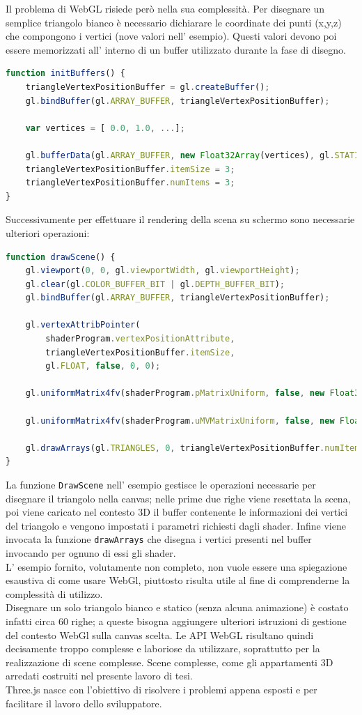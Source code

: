 Il problema di WebGL risiede però nella sua complessità.
Per disegnare un semplice triangolo bianco è necessario dichiarare le coordinate dei punti (x,y,z) che compongono i vertici (nove valori nell’ esempio).
Questi valori devono poi essere memorizzati all’ interno di un buffer utilizzato durante la fase di disegno.

\begin{lstlisting}[language=javascript]
function initBuffers() {
	triangleVertexPositionBuffer = gl.createBuffer();
	gl.bindBuffer(gl.ARRAY_BUFFER, triangleVertexPositionBuffer);

	var vertices = [ 0.0, 1.0, ...];

	gl.bufferData(gl.ARRAY_BUFFER, new Float32Array(vertices), gl.STATIC_DRAW);
	triangleVertexPositionBuffer.itemSize = 3;
	triangleVertexPositionBuffer.numItems = 3;
}
\end{lstlisting}
Successivamente per effettuare il rendering della scena su schermo sono necessarie ulteriori operazioni:

\begin{lstlisting}[language=javascript]
function drawScene() {
	gl.viewport(0, 0, gl.viewportWidth, gl.viewportHeight);
	gl.clear(gl.COLOR_BUFFER_BIT | gl.DEPTH_BUFFER_BIT);
	gl.bindBuffer(gl.ARRAY_BUFFER, triangleVertexPositionBuffer);

	gl.vertexAttribPointer(
		shaderProgram.vertexPositionAttribute,
		triangleVertexPositionBuffer.itemSize,
		gl.FLOAT, false, 0, 0);

	gl.uniformMatrix4fv(shaderProgram.pMatrixUniform, false, new Float32Array([1,0,0,0,....]));

	gl.uniformMatrix4fv(shaderProgram.uMVMatrixUniform, false, new Float32Array([1,0,0,0,..]));

	gl.drawArrays(gl.TRIANGLES, 0, triangleVertexPositionBuffer.numItems);
}
\end{lstlisting}
La funzione \texttt{DrawScene} nell’ esempio gestisce le operazioni necessarie per disegnare il triangolo nella canvas; nelle prime due righe viene resettata la scena, poi viene caricato nel contesto 3D il buffer contenente le informazioni dei vertici del triangolo e vengono impostati i parametri richiesti dagli shader.
Infine viene invocata la funzione \texttt{drawArrays} che disegna i vertici presenti nel buffer invocando per ognuno di essi gli shader.
\\
L’ esempio fornito, volutamente non completo, non vuole essere una spiegazione esaustiva di come usare WebGl, piuttosto risulta utile al fine di comprenderne la complessità di utilizzo.
\\
Disegnare un solo triangolo bianco e statico (senza alcuna animazione) è costato infatti circa 60 righe; a queste bisogna aggiungere ulteriori istruzioni di gestione del contesto WebGl sulla canvas scelta.
Le API WebGL risultano quindi decisamente troppo complesse e laboriose da utilizzare, soprattutto per la realizzazione di scene complesse. Scene complesse, come gli appartamenti 3D arredati costruiti nel presente lavoro di tesi.
\\
Three.js nasce con l’obiettivo di risolvere i problemi appena esposti e per facilitare il lavoro dello sviluppatore.

